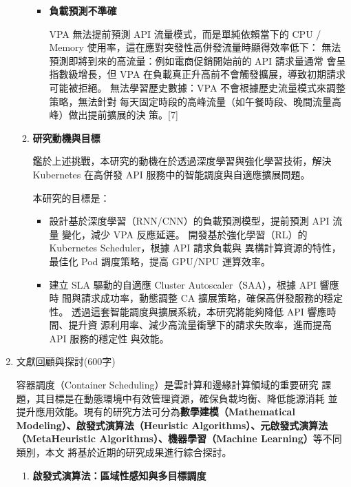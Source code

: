 \documentclass[12pt,a4paper]{article}
\begin{document}
\begin{enumerate}[label={(\zhdig*)}, leftmargin=2\parindent, listparindent=\parindent]
\begin{enumerate}[label={(\arabic*)}, leftmargin=\parindent, listparindent=\parindent]
\begin{itemize}[leftmargin=\parindent, listparindent=\parindent]
    \item \textbf{
負載預測不準確
}

VPA 無法提前預測 API 流量模式，而是單純依賴當下的 CPU /
Memory 使用率，這在應對突發性高併發流量時顯得效率低下：
無法預測即將到來的高流量：例如電商促銷開始前的 API 請求量通常
會呈指數級增長，但 VPA 在負載真正升高前不會觸發擴展，導致初期請求
可能被拒絕。
無法學習歷史數據：VPA 不會根據歷史流量模式來調整策略，無法針對
每天固定時段的高峰流量（如午餐時段、晚間流量高峰）做出提前擴展的決
策。[7]

    \end{itemize}
    \item \textbf{研究動機與目標}

鑑於上述挑戰，本研究的動機在於透過深度學習與強化學習技術，解決
Kubernetes 在高併發 API 服務中的智能調度與自適應擴展問題。

本研究的目標是：
\begin{itemize}[leftmargin=\parindent, listparindent=\parindent]

    \item 設計基於深度學習（RNN/CNN）的負載預測模型，提前預測 API 流量
變化，減少 VPA 反應延遲。
開發基於強化學習（RL）的 Kubernetes Scheduler，根據 API 請求負載與
異構計算資源的特性，最佳化 Pod 調度策略，提高 GPU/NPU 運算效率。

    \item 建立 SLA 驅動的自適應 Cluster Autoscaler（SAA），根據 API 響應時
間與請求成功率，動態調整 CA 擴展策略，確保高併發服務的穩定性。
透過這套智能調度與擴展系統，本研究將能夠降低 API 響應時間、提升資
源利用率、減少高流量衝擊下的請求失敗率，進而提高 API 服務的穩定性
與效能。
\end{itemize}

\end{enumerate}
\item 文獻回顧與探討(600字)

容器調度（Container Scheduling）是雲計算和邊緣計算領域的重要研究
課題，其目標是在動態環境中有效管理資源，確保負載均衡、降低能源消耗
並提升應用效能。現有的研究方法可分為\textbf{數學建模（Mathematical
Modeling）、啟發式演算法（Heuristic Algorithms）、元啟發式演算法（MetaHeuristic Algorithms）、機器學習（Machine Learning）}等不同類別，本文
將基於近期的研究成果進行綜合探討。
\begin{enumerate}[label={(\arabic*)}, leftmargin=\parindent, listparindent=\parindent]

    \item \textbf{
啟發式演算法：區域性感知與多目標調度}


\end{enumerate}
\end{enumerate}
\end{document}
